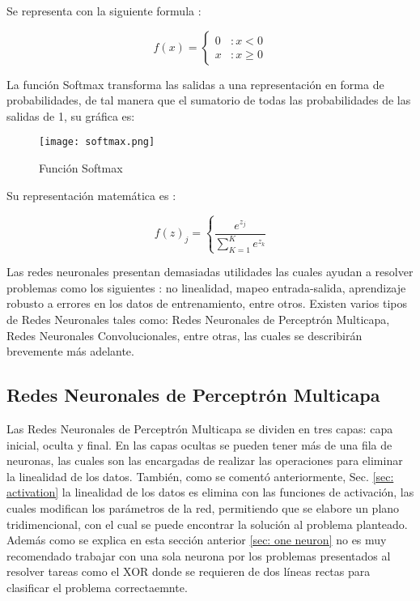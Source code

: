                 Se representa con la siguiente formula \cite{Freire2021}: 

                \[f(x) = \left\{ \begin{array}{lr} 0 & : x < 0\\ x & : x \ge 0 \end{array} \right. \]

                La función Softmax transforma las salidas a una representación en forma de 
                probabilidades, de tal manera que el sumatorio de todas las probabilidades 
                de las salidas de 1, su gr\'afica es: \label{subsec: softmax}

                \begin{figure}[H]
                    \centering
                    \texttt{[image: softmax.png]}
                    \caption{Funci\'on Softmax}
                    \label{fig:fig7}
                \end{figure}

                Su representaci\'on matem\'atica es \cite{calvo-2018}:

                \[f(z)_j = \left\{ \frac{e^{z_j}}{\sum_{K=1}^{K} e^{z_k}} \right. \]

        Las redes neuronales presentan demasiadas utilidades las cuales ayudan a resolver problemas como los 
        siguientes \cite{liu2015}: no linealidad, mapeo entrada-salida, aprendizaje robusto 
        a errores en los datos de entrenamiento, entre otros.  Existen varios tipos de Redes Neuronales tales como: Redes Neuronales de Perceptr\'on 
        Multicapa, Redes Neuronales Convolucionales, entre otras, las cuales se describirán brevemente más adelante.
    
        \subsection{Redes Neuronales de Perceptr\'on Multicapa}
        
            Las Redes Neuronales de Perceptr\'on Multicapa se dividen en tres capas: capa inicial, oculta y final. En las capas ocultas se pueden 
            tener m\'as de una fila de neuronas, las cuales son las encargadas de realizar las operaciones para eliminar 
            la linealidad de los datos.  También, como se comentó anteriormente,  Sec. \eqref{sec: activation} la linealidad de los datos es elimina 
            con las funciones de activaci\'on,  las cuales modifican los parámetros de la red,  permitiendo que se elabore un plano tridimencional,  
            con el cual se puede encontrar la soluci\'on al problema planteado.\\
            Adem\'as como se explica en esta sección anterior \eqref{sec: one neuron} no es muy recomendado trabajar con una sola 
            neurona por los problemas presentados al resolver tareas como el XOR donde se requieren de dos líneas rectas para clasificar el problema correctaemnte.

